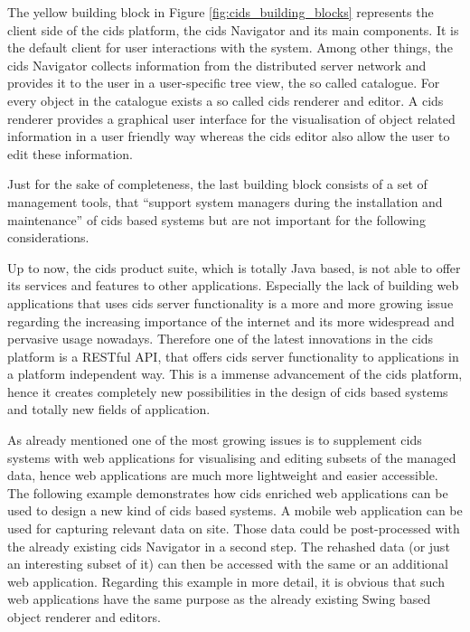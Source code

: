  
The yellow building block in Figure \ref{fig:cids_building_blocks} represents the client side of the cids platform, the cids Navigator and its main components.
It is the default client for user interactions with the system.
Among other things, the cids Navigator collects information from the distributed server network and provides it to the user in a user-specific tree view, the so called catalogue.
For every object in the catalogue exists a so called cids renderer and editor.
A cids renderer provides a graphical user interface for the visualisation of object related information in a user friendly way whereas the cids editor also allow the user to edit these information.

Just for the sake of completeness, the last building block consists of a set of management tools, that ``support system managers during the installation and maintenance'' \autocite[]{cismet-cids-readMe} of cids based systems but are not important for the following considerations.

Up to now, the cids product suite, which is totally Java based, is not able to offer its services and features to other applications.
Especially the lack of building web applications that uses cids server functionality is a more and more growing issue regarding the increasing importance of the internet and its more widespread and pervasive usage nowadays.
Therefore one of the latest innovations in the cids platform is a RESTful API, that offers cids server functionality to applications in a platform independent way.
This is a immense advancement of the cids platform, hence it creates completely new possibilities in the design of cids based systems and totally new fields of application.

As already mentioned one of the most growing issues is to supplement cids systems with web applications for visualising and editing subsets of the managed data, hence web applications are much more lightweight and easier accessible.
The following example demonstrates how cids enriched web applications can be used to design a new kind of cids based systems.
A mobile web application can be used for capturing relevant data on site.
Those data could be post-processed with the already existing cids Navigator in a second step.
The rehashed data (or just an interesting subset of it) can then be accessed with the same or an additional web application.
Regarding this example in more detail, it is obvious that such web applications have the same purpose as the already existing Swing based object renderer and editors.

